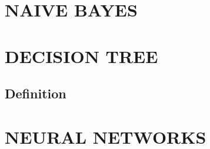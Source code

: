 \documentclass[8pt,letterpaper]{book}
\begin{document}
\chapter{NAIVE BAYES}

\chapter{DECISION TREE}
\section{Definition}

\chapter{NEURAL NETWORKS}














\end{document}

